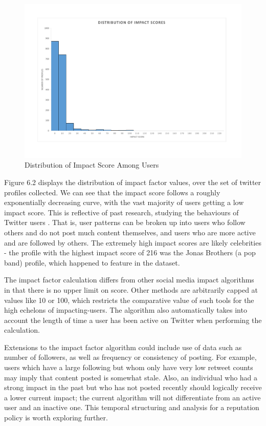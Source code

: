 \begin{figure}[h!]
\begin{center}
\centering
\includegraphics[width=500px]{Images/impact_distribution_histogram.pdf}
\caption{Distribution of Impact Score Among Users}
\end{center}
\end{figure}

Figure 6.2 displays the distribution of impact factor values, over the set of twitter profiles collected. We can see that the impact score follows a roughly exponentially decreasing curve, with the vast majority of users getting a low impact score. This is reflective of past research, studying the behaviours of Twitter users \cite{beevolve}. That is, user patterns can be broken up into users who follow others and do not post much content themselves, and users who are more active and are followed by others. The extremely high impact scores are likely celebrities - the profile with the highest impact score of 216 was the Jonas Brothers (a pop band) profile, which happened to feature in the dataset. 

The impact factor calculation differs from other social media impact algorithms in that there is no upper limit on score. Other methods are arbitrarily capped at values like 10 or 100, which restricts the comparative value of such tools for the high echelons of impacting-users. The algorithm also automatically takes into account the length of time a user has been active on Twitter when performing the calculation. 

Extensions to the impact factor algorithm could include use of data such as number of followers, as well as frequency or consistency of posting. For example, users which have a large following but whom only have very low retweet counts may imply that content posted is somewhat stale. Also, an individual who had a strong impact in the past but who has not posted recently should logically receive a lower current impact; the current algorithm will not differentiate from an active user and an inactive one. This temporal structuring and analysis for a reputation policy is worth exploring further. 

